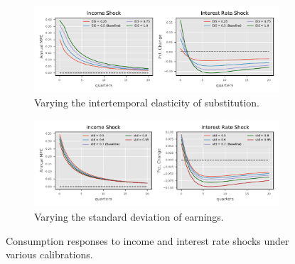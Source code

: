 \begin{figure}[H]

\centering
\begin{subfigure}{.9\textwidth}
  \centering
  \includegraphics[width=.98\linewidth]{mainmatter/plots/SS_evaluation/Alternative_calibs/C_R_earnings_EIS.pdf} 

  \caption{Varying the intertemporal elasticity of substitution. \label{fig:calibration_C_r_eis} } 
\end{subfigure}

\begin{subfigure}{.9\textwidth}
  \centering
  \includegraphics[width=.98\linewidth]{mainmatter/plots/SS_evaluation/Alternative_calibs/C_R_earnings_std.pdf} 
  \caption{Varying the standard deviation of earnings. }  \label{fig:calibration_C_r_std}
\end{subfigure}

\caption{Consumption responses to income and interest rate shocks under various calibrations.}
\label{fig:dC_robust}
\end{figure}



